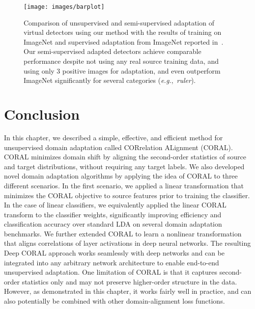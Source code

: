\documentclass[graybox]{svmult}
\newcommand\eg{\emph{e.g.}}
\begin{document}
\begin{figure}
\centering
\texttt{[image: images/barplot]}
\caption[\small Comparison of unsupervised and semi-supervised adaptation of virtual detectors using our method with the results of training on ImageNet and supervised adaptation from ImageNet reported in~\cite{ICRA14}]{\small Comparison of unsupervised and semi-supervised adaptation of virtual detectors using our method with the results of training on ImageNet and supervised adaptation from ImageNet reported in~\cite{ICRA14}. Our semi-supervised adapted detectors achieve comparable performance despite not using any real source training data, and using only 3 positive images for adaptation, and even outperform ImageNet significantly for several categories (\eg,~\textit{ruler}).}
\label{chap4_fig:barplot}
\end{figure} \section{Conclusion}
\label{sec:con}
In this chapter, we described a simple, effective, and efficient method for unsupervised domain adaptation called CORrelation ALignment (CORAL). CORAL minimizes domain shift by aligning the second-order statistics of source and target distributions, without requiring any target labels. We also developed novel domain adaptation algorithms by applying the idea of CORAL to three different scenarios. In the first scenario, we applied a linear transformation that minimizes the CORAL objective to source features prior to training the classifier. In the case of linear classifiers, we equivalently applied the linear CORAL transform to the classifier weights, significantly improving efficiency and classification accuracy over standard LDA on several domain adaptation benchmarks. We further extended CORAL to learn a nonlinear transformation that aligns correlations of layer activations in deep neural networks. The resulting Deep CORAL approach works seamlessly with deep networks and can be integrated into any arbitrary network architecture to enable end-to-end unsupervised adaptation. One limitation of CORAL is that it captures second-order statistics only and may not preserve higher-order structure in the data. However, as demonstrated in this chapter, it works fairly well in practice, and can also potentially be combined with other domain-alignment loss functions.  


\end{document}
